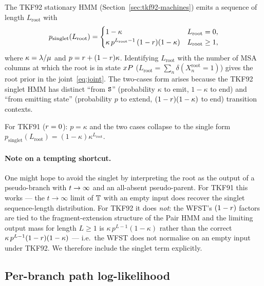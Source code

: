 The TKF92 stationary HMM (Section~\ref{sec:tkf92-machines}) emits a
sequence of length $L_{\text{root}}$ with
\begin{equation}
\label{eq:singlet-tkf92}
p_{\text{singlet}}(L_{\text{root}})
= \begin{cases}
1 - \kappa & L_{\text{root}} = 0, \\
\kappa\, p^{L_{\text{root}} - 1}\,(1-r)(1-\kappa)
       & L_{\text{root}} \geq 1,
\end{cases}
\end{equation}
where $\kappa = \lambda/\mu$ and $p = r + (1-r)\kappa$.
Identifying $L_{\text{root}}$ with the number of MSA columns at which
the root is in state $x{P}$
($L_{\text{root}} = \sum_n \delta(X^{\text{root}}_n = 1)$) gives the
root prior in the joint~\eqref{eq:joint}.
The two-cases form arises because the TKF92 singlet HMM has distinct
``from ${\tt S}$'' (probability $\kappa$ to emit, $1-\kappa$ to end) and
``from emitting state'' (probability $p$ to extend, $(1-r)(1-\kappa)$
to end) transition contexts.

For TKF91 ($r = 0$): $p = \kappa$ and the two cases collapse to the
single form $p_{\text{singlet}}(L_{\text{root}}) = (1-\kappa)\kappa^{L_{\text{root}}}$.

\paragraph{Note on a tempting shortcut.}
One might hope to avoid the singlet by interpreting the root as the
output of a pseudo-branch with $t \to \infty$ and an
all-absent pseudo-parent.
For TKF91 this works — the $t \to \infty$ limit of $\mathbb{T}$ with an
empty input does recover the singlet sequence-length distribution.
For TKF92 it does \emph{not}: the WFST's $(1-r)$ factors are tied
to the fragment-extension structure of the Pair HMM and the limiting
output mass for length $L \geq 1$ is $\kappa\,p^{L-1}(1-\kappa)$
rather than the correct $\kappa\,p^{L-1}(1-r)(1-\kappa)$ —
i.e.\ the WFST does not normalise on an empty input under TKF92.
We therefore include the singlet term explicitly.

\subsection{Per-branch path log-likelihood}
\label{sec:varanc-presence-path-LL}

